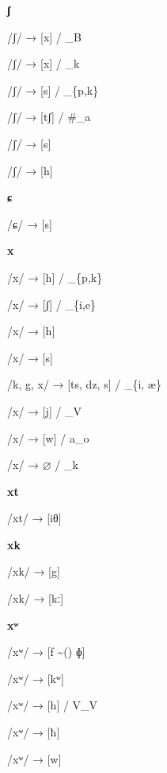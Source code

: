\begin{center}\textbf{ʃ}\end{center}
\begin{multicols}{4}
\noindent /ʃ/ → [x] / \_B

\noindent /ʃ/ → [x] / \_k

\noindent /ʃ/ → [s] / \_\{p,k\}

\noindent /ʃ/ → [tʃ] / \#\_a

\noindent /ʃ/ → [s]

\noindent /ʃ/ → [h]
\end{multicols}


\begin{center}\textbf{ɕ}\end{center}
\begin{multicols}{4}
\noindent /ɕ/ → [s]
\end{multicols}

\begin{center}\textbf{x}\end{center}
\begin{multicols}{4}
\noindent /x/ → [h] / \_\{p,k\}

\noindent /x/ → [ʃ] / \_\{i,e\}

\noindent /x/ → [h]

\noindent /x/ → [s]

\noindent /k, g, x/ → [ts, dz, s] / \_\{i, æ\}

\noindent /x/ → [j] / \_V

\noindent /x/ → [w] / a\_o

\noindent /x/ → $\varnothing$ / \_k
\end{multicols}


\begin{center}\textbf{xt}\end{center}
\begin{multicols}{4}
\noindent /xt/ → [iθ]
\end{multicols}


\begin{center}\textbf{xk}\end{center}
\begin{multicols}{4}
\noindent /xk/ → [g]

\noindent /xk/ → [kː]
\end{multicols}


\begin{center}\textbf{xʷ}\end{center}
\begin{multicols}{4}
\noindent /xʷ/ → [f \textasciitilde() ɸ]

\noindent /xʷ/ → [kʷ]

\noindent /xʷ/ → [h] / V\_V

\noindent /xʷ/ → [ħ]

\noindent /xʷ/ → [w]
\end{multicols}


